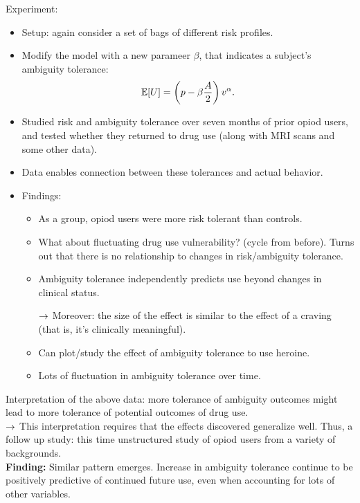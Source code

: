 Experiment:
\begin{itemize}
    \item Setup: again consider a set of bags of different risk profiles.
    \item Modify the model with a new parameer $\beta$, that indicates a subject's ambiguity tolerance:
    \[
    \mathbb{E}[U] = \left(p-\beta \frac{A}{2}\right)v^{\alpha}.
    \]
    
    \item Studied risk and ambiguity tolerance over seven months of prior opiod users, and tested whether they returned to drug use (along with MRI scans and some other data).
    
    \item Data enables connection between these tolerances and actual behavior.
    
    \item Findings:
    \begin{itemize}
        \item As a group, opiod users were more risk tolerant than controls.
        \item What about fluctuating drug use vulnerability? (cycle from before). Turns out that there is no relationship to changes in risk/ambiguity tolerance.
        
        \item Ambiguity tolerance independently predicts use beyond changes in clinical status.
        
        $\rightarrow$ Moreover: the size of the effect is similar to the effect of a craving (that is, it's clinically meaningful).
        
        \item Can plot/study the effect of ambiguity tolerance to use heroine.
        \item Lots of fluctuation in ambiguity tolerance over time.
    \end{itemize}
\end{itemize}

Interpretation of the above data: more tolerance of ambiguity outcomes might lead to more tolerance of potential outcomes of drug use. \\

$\rightarrow$ This interpretation requires that the effects discovered generalize well. Thus, a follow up study: this time unstructured study of opiod users from a variety of backgrounds. \\

{\bf Finding:} Similar pattern emerges. Increase in ambiguity tolerance continue to be positively predictive of continued future use, even when accounting for lots of other variables. \\

